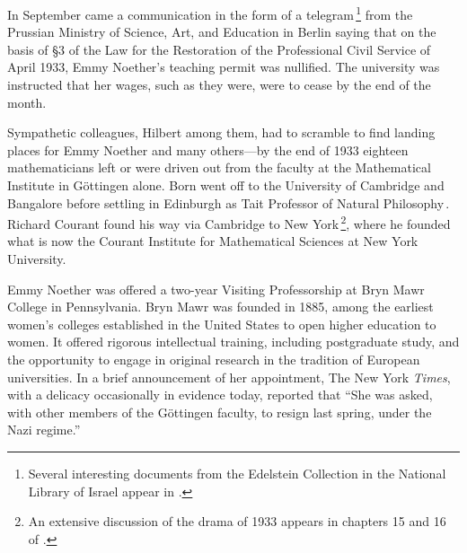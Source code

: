 \documentclass[twoside,symmetric]{tufte-handout}
\begin{document}
In September came a communication in the form of a telegram$\,$\footnote{Several interesting documents from the Edelstein Collection in the National Library of Israel appear in .} from the Prussian Ministry of Science, Art, and Education in Berlin saying that on the basis of \S3 of the Law for the Restoration of the Professional Civil Service of April 1933, Emmy Noether's teaching permit was nullified. The university was instructed that her wages, such as they were, were to cease by the end of the month.

Sympathetic colleagues, Hilbert among them, had to scramble to find landing places for Emmy Noether and many others---by the end of 1933 eighteen mathematicians left or were driven out from the faculty at the Mathematical Institute in G\"ottingen alone.
 Born went off to the University of Cambridge and Bangalore before settling in Edinburgh as Tait Professor of Natural Philosophy$\,$\cite[-24pt]{born1978my}. Richard Courant found his way via Cambridge to New York$\,$\footnote{An extensive discussion of the drama of 1933 appears in chapters 15 and 16 of .}, where he founded what is now the Courant Institute for Mathematical Sciences at New York University.

 Emmy Noether was offered a two-year Visiting Professorship at Bryn Mawr College in Pennsylvania.
 Bryn Mawr was founded in 1885, among the earliest women's colleges established in the United States to open higher education to women. It offered rigorous intellectual training, including postgraduate study, and the opportunity to engage in original research in the tradition of European universities.
 In a brief announcement of her appointment, The New York \emph{Times}, with a delicacy occasionally in evidence today, reported that ``She was asked, with other members of the G\"ottingen faculty, to resign last spring, under the Nazi regime.''$\,$\cite[]{nyt1933}
\end{document}
